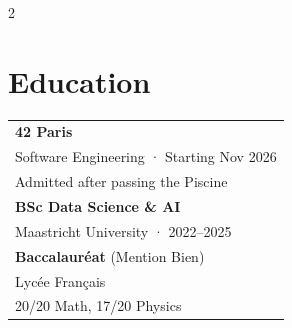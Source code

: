 \documentclass[lighthipster]{simplehipstercv}
\begin{document}
\begin{paracol}{2}
\begin{minipage}[t]{0.5\textwidth}
\section*{Education}
\begin{tabular}{>{\footnotesize}p{}}
    \textbf{42 Paris} \\
    Software Engineering · Starting Nov 2026 \\
    Admitted after passing the Piscine \\[0.5em]

    \textbf{BSc Data Science \& AI} \\
    Maastricht University · 2022--2025 \\[0.5em]

    \textbf{Baccalauréat} (Mention Bien) \\
    Lycée Français \\
    20/20 Math, 17/20 Physics \\
\end{tabular}
\end{minipage}

\end{paracol}
\end{document}
